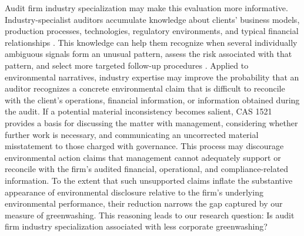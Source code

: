 \documentclass[11pt]{article}
\begin{document}
Audit firm industry specialization may make this evaluation more informative.
Industry-specialist auditors accumulate knowledge about clients' business models, production processes, technologies, regulatory environments, and typical financial relationships \citep{solomon1999industry,francis2011framework,reichelt2010national}.
This knowledge can help them recognize when several individually ambiguous signals form an unusual pattern, assess the risk associated with that pattern, and select more targeted follow-up procedures \citep{owhoso2002error,low2004effects,hammersley2006pattern}.
Applied to environmental narratives, industry expertise may improve the probability that an auditor recognizes a concrete environmental claim that is difficult to reconcile with the client's operations, financial information, or information obtained during the audit.
If a potential material inconsistency becomes salient, CAS 1521 provides a basis for discussing the matter with management, considering whether further work is necessary, and communicating an uncorrected material misstatement to those charged with governance.
This process may discourage environmental action claims that management cannot adequately support or reconcile with the firm's audited financial, operational, and compliance-related information.
To the extent that such unsupported claims inflate the substantive appearance of environmental disclosure relative to the firm's underlying environmental performance, their reduction narrows the gap captured by our measure of greenwashing.
This reasoning leads to our research question: Is audit firm industry specialization associated with less corporate greenwashing?
\end{document}
